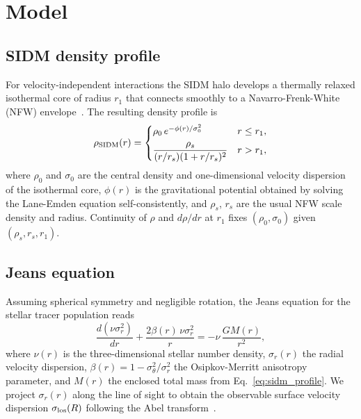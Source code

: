 \section{Model}
\label{sec:model}

\subsection{SIDM density profile}

For velocity-independent interactions the SIDM halo develops a thermally
relaxed isothermal core of radius $r_{1}$ that connects smoothly to a
Navarro-Frenk-White (NFW) envelope~\cite{Tulin2018}.
The resulting density profile is
\begin{equation}
  \rho_{\rm SIDM}(r) =
  \begin{cases}
    \rho_{0}\,e^{-\phi(r)/\sigma_{0}^{2}} & r \le r_{1}, \\[4pt]
    \dfrac{\rho_{s}}{(r/r_{s})(1+r/r_{s})^{2}} & r > r_{1},
  \end{cases}
  \label{eq:sidm_profile}
\end{equation}
where $\rho_{0}$ and $\sigma_{0}$ are the central density and one-dimensional
velocity dispersion of the isothermal core, $\phi(r)$ is the gravitational
potential obtained by solving the Lane-Emden equation self-consistently, and
$\rho_{s}$, $r_{s}$ are the usual NFW scale density and radius.
Continuity of $\rho$ and $d\rho/dr$ at $r_{1}$ fixes $(\rho_{0},\sigma_{0})$
given $(\rho_{s}, r_{s}, r_{1})$.

\subsection{Jeans equation}

Assuming spherical symmetry and negligible rotation, the Jeans equation for the
stellar tracer population reads
\begin{equation}
  \frac{d(\nu\sigma_{r}^{2})}{dr}
  + \frac{2\beta(r)\,\nu\sigma_{r}^{2}}{r}
  = -\nu\,\frac{G M(r)}{r^{2}},
  \label{eq:jeans}
\end{equation}
where $\nu(r)$ is the three-dimensional stellar number density, $\sigma_{r}(r)$
the radial velocity dispersion, $\beta(r) = 1 - \sigma_{\theta}^{2}/\sigma_{r}^{2}$
the Osipkov-Merritt anisotropy parameter, and $M(r)$ the enclosed total mass
from Eq.~\eqref{eq:sidm_profile}.
We project $\sigma_{r}(r)$ along the line of sight to obtain the observable
surface velocity dispersion $\sigma_{\rm los}(R)$ following the Abel
transform~\cite{Mamon2005}.

